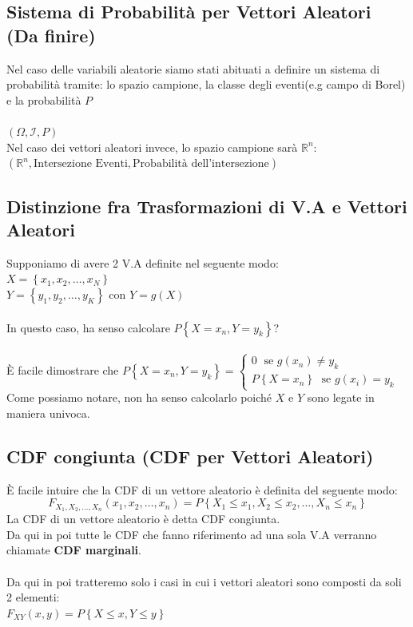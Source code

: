 \documentclass{article}
\begin{document}
\subsection{Sistema di Probabilità per Vettori Aleatori (Da finire)}
Nel caso delle variabili aleatorie siamo stati abituati a definire un sistema di probabilità tramite: lo spazio campione, la classe degli eventi(e.g campo di Borel) e la probabilità $P$ \\ \\
$(\Omega, \mathcal{I}, P)$ \\
Nel caso dei vettori aleatori invece, lo spazio campione sarà $\mathbb{R}^n$: \\
$(\mathbb{R}^n , \text{Intersezione Eventi} , \text{Probabilità dell'intersezione})$

\subsection{Distinzione fra Trasformazioni di V.A e Vettori Aleatori}
Supponiamo di avere 2 V.A definite nel seguente modo: \\
$X = \left\{x_1, x_2, \dots, x_N\right\}$ \\
$Y = \left\{y_1, y_2, \dots, y_K\right\}$ con $Y = g(X)$ \\ \\
In questo caso, ha senso calcolare $P \left\{X = x_n, Y=y_k\right\}$? \\ \\
È facile dimostrare che $P \left\{X = x_n, Y=y_k\right\} = 
\begin{cases}
0 \;\text{ se } g(x_n) \neq y_k \\
P \left\{X = x_n \right\} \;\text{ se } g(x_i) = y_k
\end{cases}$ \\
Come possiamo notare, non ha senso calcolarlo poiché $X$ e $Y$ sono legate in maniera univoca.

\subsection{CDF congiunta (CDF per Vettori Aleatori)}
È facile intuire che la CDF di un vettore aleatorio è definita del seguente modo:
\[F_{X_1,X_2, \dots ,X_n} \left( x_1,x_2, \dots ,x_n \right) = P \left\{ X_1 \leq x_1, X_2 \leq x_2, \dots , X_n \leq x_n\right\}\]
La CDF di un vettore aleatorio è detta CDF congiunta. \\
Da qui in poi tutte le CDF che fanno riferimento ad una sola V.A verranno chiamate \textbf{CDF marginali}. \\ \\
Da qui in poi tratteremo solo i casi in cui i vettori aleatori sono composti da soli 2 elementi: \\
$F_{XY}(x,y) = P\left\{X \leq x,Y \leq y\right\}$
\end{document}
